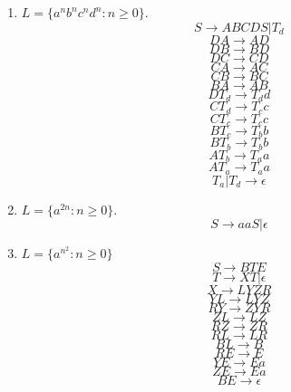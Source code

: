 \documentclass[paper=a4, fontsize=11pt]{scrartcl} %
\begin{document}
\begin{enumerate}
\item $L = \{a^{n}b^{n}c^{n}d^{n} : n\geq 0\}$.
  $$S \rightarrow ABCDS | T_d$$
  $$DA \rightarrow AD$$
  $$DB \rightarrow BD$$
  $$DC \rightarrow CD$$
  $$CA \rightarrow AC$$
  $$CB \rightarrow BC$$
  $$BA \rightarrow AB$$
  $$DT_d \rightarrow T_dd$$
  $$CT_d \rightarrow T_cc$$
  $$CT_c \rightarrow T_cc$$
  $$BT_c \rightarrow T_bb$$
  $$BT_b \rightarrow T_bb$$
  $$AT_b \rightarrow T_aa$$
  $$AT_a \rightarrow T_aa$$
  $$T_a | T_d \rightarrow \epsilon$$

\item $L = \{a^{2n} : n\geq 0\}$.
  $$S \rightarrow aaS | \epsilon$$

\item $L = \{a^{n^{2}} : n\geq 0\}$
  $$S \rightarrow BTE$$
  $$T \rightarrow XT | \epsilon$$
  $$X \rightarrow LYZR$$
  $$YL \rightarrow LYZ$$
  $$RY \rightarrow ZYR$$
  $$ZL \rightarrow LZ$$
  $$RZ \rightarrow ZR$$
  $$RL \rightarrow LR$$
  $$BL \rightarrow B$$
  $$RE \rightarrow E$$
  $$YE \rightarrow Ea$$
  $$ZE \rightarrow Ea$$
  $$BE \rightarrow \epsilon$$

\end{enumerate}


\pagebreak
\end{document}
